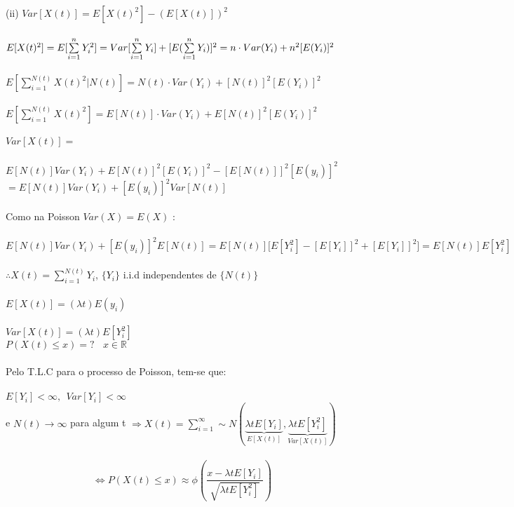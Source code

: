 \documentclass[a4paper,12pt]{article}
\begin{document}
(ii) $Var[X(t)]=E[X(t)^2]-(E[X(t)])^2$\\
\\
$E[X(t)^2]=E[\sum\limits_{i=1}^{n}Y_i^2]=Var[\sum\limits_{i=1}^{n}Y_i]+[E(\sum\limits_{i=1}^{n}Y_i)]^2\\
=n\cdot Var(Y_i)+n^2[E(Y_i)]^2$\\
\\
$E[\sum\limits_{i=1}^{N(t)}X(t)^2|N(t)]=N(t)\cdot Var(Y_i)+[N(t)]^2[E(Y_i)]^2$\\
\\
$E[\sum\limits_{i=1}^{N(t)}X(t)^2]=E[N(t)]\cdot Var(Y_i)+E[N(t)]^2[E(Y_i)]^2$\\
\\
$Var[X(t)]=$
\\
\\
$E[N(t)]Var(Y_i)+E[N(t)]^2[E(Y_i)]^2-[E[N(t)]]^2[E(y_i)]^2$\\
$=E[N(t)]Var(Y_i)+[E(y_i)]^2Var[N(t)]$\\
\\
Como na Poisson $Var(X)=E(X)$ :\\
\\
$E[N(t)]Var(Y_i)+[E(y_i)]^2E[N(t)]=E[N(t)]\Bigg[E[Y_i^2]-[E[Y_i]]^2+[E[Y_i]]^2\Bigg]=E[N(t)]E[Y_i^2]$\\
\\
$\therefore X(t)=\sum\limits_{i=1}^{N(t)}Y_i$, $\{ Y_i\}$ i.i.d independentes de $\{N(t)\}$\\
\\
$E[X(t)]=(\lambda t) E(y_i)$\\
\\
$Var[X(t)]=(\lambda t)E[Y_i^2] $\\
\newpage
$P\left(X(t)\le x\right)=? \ \ \ \ x\in \mathbb{R}$\\
\\
Pelo T.L.C para o processo de Poisson, tem-se que:\\
\\
$E[Y_i]<\infty,\ \ Var[Y_i]<\infty$\\
 e $N(t)\rightarrow\infty $ para algum t $\Rightarrow X(t)=\sum\limits_{i=1}^{\infty}\sim N(\underbrace{\lambda tE[Y_i]}_{E[X(t)]},\underbrace{\lambda tE[Y_i^2]}_{Var[X(t)]})$\\
 \\
 $$\Leftrightarrow P(X(t)\le x)\approx\phi\left(\frac{x-\lambda tE[Y_i]}{\sqrt{\lambda tE[Y_i^2]}}\right) $$
 \newpage
\end{document}
